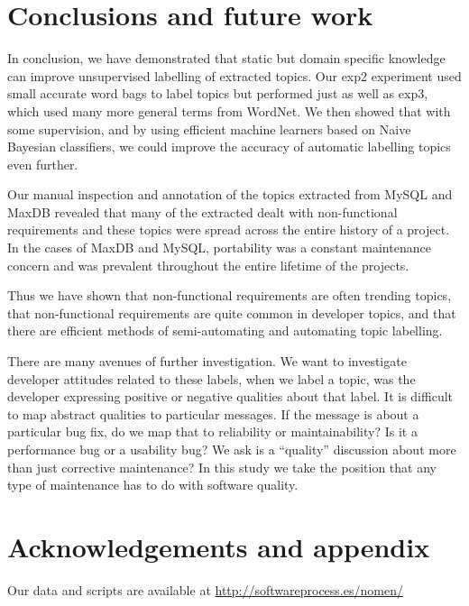 \documentclass{acm_proc_article-sp}
\begin{document}


\section{Conclusions and future work}

In conclusion, we have demonstrated that static but domain specific knowledge can improve unsupervised labelling of extracted topics. Our \textsf{exp2} experiment used small accurate word bags to label topics but performed just as well as \textsf{exp3}, which used many more general terms from WordNet. We then showed that with some supervision, and by using efficient machine learners based on Naive Bayesian classifiers, we could improve the accuracy of automatic labelling topics even further.

Our manual inspection and annotation of the topics extracted from MySQL and MaxDB revealed that many of the extracted dealt with non-functional requirements and these topics were spread across the entire history of a project. In the cases of MaxDB and MySQL, portability was a constant maintenance concern and was prevalent throughout the entire lifetime of the projects.

Thus we have shown that non-functional requirements are often trending topics, that non-functional requirements are quite common in developer topics, and that there are efficient methods of semi-automating and automating topic labelling.

There are many avenues of further investigation.  We want to investigate developer attitudes related to these labels, when we label a topic, was the developer expressing positive or negative qualities about that label.  It is difficult to map abstract qualities to particular messages. If the message is about a particular bug fix, do we map that to reliability or maintainability? Is it a performance bug or a usability bug? We ask is a ``quality'' discussion about more than just corrective maintenance? In this study we take the position that any type of maintenance has to do with software quality.


\section{Acknowledgements and appendix}
Our data and scripts are available at \url{http://softwareprocess.es/nomen/}


%

\end{document}
